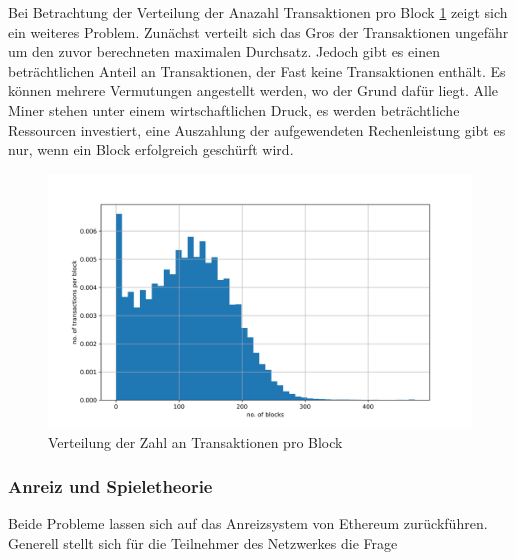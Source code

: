 \documentclass[runningheads]{llncs}
\begin{document}
Bei Betrachtung der Verteilung der Anazahl Transaktionen pro Block \ref{blocks_transactions_per_block} zeigt sich ein weiteres Problem. Zunächst verteilt sich das Gros der Transaktionen ungefähr um den zuvor berechneten maximalen Durchsatz. Jedoch gibt es einen beträchtlichen Anteil an Transaktionen, der Fast keine Transaktionen enthält. Es können mehrere Vermutungen angestellt werden, wo der Grund dafür liegt. Alle Miner stehen unter einem wirtschaftlichen Druck, es werden beträchtliche Ressourcen investiert, eine Auszahlung der aufgewendeten Rechenleistung gibt es nur, wenn ein Block erfolgreich geschürft wird. \cite{research_empty_nodate}

\begin{figure}[h]
  \includegraphics[width=\textwidth, keepaspectratio]{blocks_transactions_per_block.png}
  \caption{Verteilung der Zahl an Transaktionen pro Block \cite{neemann_appendix_nodate}}
  \label{blocks_transactions_per_block}
\end{figure}

\subsubsection{Anreiz und Spieletheorie}
Beide Probleme lassen sich auf das Anreizsystem von Ethereum zurückführen. Generell stellt sich für die Teilnehmer des Netzwerkes die Frage  
\end{document}
